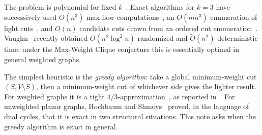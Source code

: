 \documentclass[preprint,12pt]{elsarticle}
\theoremstyle{definition}
\begin{document}
The problem is polynomial for fixed $k$~\cite{GoldschmidtHochbaum1994}. Exact algorithms for $k=3$ have
successively used $O(n^3)$ max-flow computations~\cite{Kapoor1996,KamidoiWY2002}, an $O(mn^3)$
enumeration of light cuts~\cite{BurletGoldschmidt1997}, and $O(n)$ candidate cuts drawn from an ordered
cut enumeration~\cite{NagamochiIbaraki2000}. Vaughn~\cite{Vaughn2026} recently obtained
$O(n^2\log^2 n)$ randomized and $\tilde O(n^2)$ deterministic time; under the Max-Weight Clique
conjecture this is essentially optimal in general weighted graphs.

The simplest heuristic is the \emph{greedy algorithm}: take a global minimum-weight cut $(S,V\setminus S)$,
then a minimum-weight cut of whichever side gives the lighter result. For weighted graphs it is a tight
$4/3$-approximation~\cite{HochbaumTsai1983}, as reported in~\cite{HochbaumShmoys1985}. For unweighted
planar graphs, Hochbaum and Shmoys~\cite{HochbaumShmoys1985} proved, in the language of dual cycles, that it
is exact in two structural situations. This note asks when the greedy algorithm is exact in general.
\end{document}
